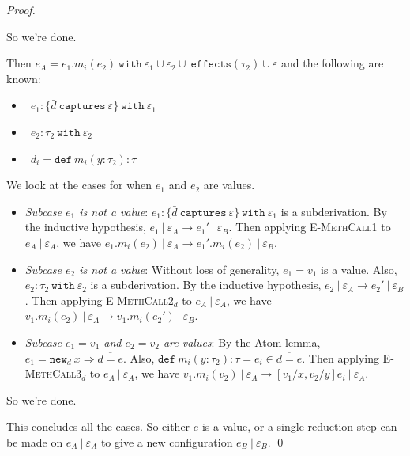 \documentclass{llncs}
\newcommand{\keywadj}[1]{\mathtt{#1}}
\newcommand{\keyw}[1]{\keywadj{#1}~}
\newcommand{\pcase}[1][]{
  \if\relax\detokenize{#1}\relax
    \def\thiscase{}
  \else
    \def\thiscase{~#1}
  \fi
  \item
}
\begin{document}
\begin{proof}
\begin{pcases}
\begin{itemize}
\end{itemize}

So we're done.\\


\pcase[\textsc{C-MethCall}]

Then $e_A = e_1.m_i(e_2)~\keyw{with} \varepsilon_1 \cup \varepsilon_2 \cup~\keywadj{effects}(\tau_2) \cup \varepsilon$ and the following are known:

\begin{itemize}
	\item ~$e_1 : \{ \bar d~\keyw{captures} \varepsilon \}~\keywadj{with}~\varepsilon_1$
	\item ~$e_2 : \tau_2~\keyw{with} \varepsilon_2$
	\item ~$d_i = \keyw{def} m_i(y : \tau_2) : \tau$
\end{itemize}
	We look at the cases for when $e_1$ and $e_2$ are values.
	
\begin{itemize}
	\item[] \textit{Subcase $e_1$ is not a value}: $e_1 : \{ \bar d~\keyw{captures} \varepsilon \}~\keywadj{with}~\varepsilon_1$ is a subderivation. By the inductive hypothesis, $e_1~|~\varepsilon_A \longrightarrow e_1'~|~\varepsilon_B$. Then applying \textsc{E-MethCall1} to $e_A~|~\varepsilon_A$, we have $e_1.m_i(e_2)~|~\varepsilon_A \longrightarrow e_1'.m_i(e_2)~|~\varepsilon_B$. \\
	
	\item[] \textit{Subcase $e_2$ is not a value}: Without loss of generality, $e_1 = v_1$ is a value. Also, $e_2 : \tau_2~\keyw{with} \varepsilon_2$ is a subderivation. By the inductive hypothesis, $e_2~|~\varepsilon_A \longrightarrow e_2'~|~\varepsilon_B$. Then applying \textsc{E-MethCall2$_d$} to $e_A~|~\varepsilon_A$, we have $v_1.m_i(e_2)~|~\varepsilon_A \longrightarrow v_1.m_i(e_2')~|~\varepsilon_B$. \\
	
	\item[] \textit{Subcase $e_1 = v_1$ and $e_2 = v_2$ are values}: By the Atom lemma, $e_1 = \keywadj{new}_d~x \Rightarrow \overline{ d = e }$. Also, $\keyw{def} m_i(y : \tau_2) : \tau = e_i \in \overline {d = e}$. Then applying \textsc{E-MethCall3$_d$} to $e_A~|~\varepsilon_A$, we have $v_1.m_i(v_2)~|~\varepsilon_A \longrightarrow [v_1/x, v_2/y]e_i~|~\varepsilon_A$.
	
\end{itemize}

So we're done.

\end{pcases}

\noindent
This concludes all the cases. So either $e$ is a value, or a single reduction step can be made on $e_A~|~\varepsilon_A$ to give a new configuration $e_B~|~\varepsilon_B$. \qed

\end{proof}
\end{document}
